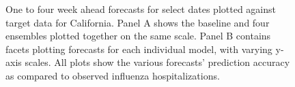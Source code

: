 \documentclass[
]{article}
\begin{document}
\begin{figure}


\caption{\label{fig-plot-forecasts-hubVis}One to four week ahead
forecasts for select dates plotted against target data for California.
Panel A shows the baseline and four ensembles plotted together on the
same scale. Panel B contains facets plotting forecasts for each
individual model, with varying y-axis scales. All plots show the various
forecasts' prediction accuracy as compared to observed influenza
hospitalizations.}

\end{figure}%
\end{document}
